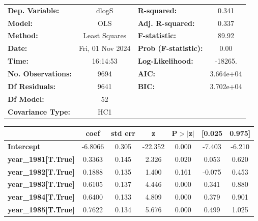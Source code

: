\begin{center}
\begin{tabular}{lclc}
\toprule
\textbf{Dep. Variable:}     &      dlogS       & \textbf{  R-squared:         } &     0.341   \\
\textbf{Model:}             &       OLS        & \textbf{  Adj. R-squared:    } &     0.337   \\
\textbf{Method:}            &  Least Squares   & \textbf{  F-statistic:       } &     89.92   \\
\textbf{Date:}              & Fri, 01 Nov 2024 & \textbf{  Prob (F-statistic):} &     0.00    \\
\textbf{Time:}              &     16:14:53     & \textbf{  Log-Likelihood:    } &   -18265.   \\
\textbf{No. Observations:}  &        9694      & \textbf{  AIC:               } & 3.664e+04   \\
\textbf{Df Residuals:}      &        9641      & \textbf{  BIC:               } & 3.702e+04   \\
\textbf{Df Model:}          &          52      & \textbf{                     } &             \\
\textbf{Covariance Type:}   &       HC1        & \textbf{                     } &             \\
\bottomrule
\end{tabular}
\begin{tabular}{lcccccc}
                            & \textbf{coef} & \textbf{std err} & \textbf{z} & \textbf{P$> |$z$|$} & \textbf{[0.025} & \textbf{0.975]}  \\
\midrule
\textbf{Intercept}          &      -6.8066  &        0.305     &   -22.352  &         0.000        &       -7.403    &       -6.210     \\
\textbf{year\_1981[T.True]} &       0.3363  &        0.145     &     2.326  &         0.020        &        0.053    &        0.620     \\
\textbf{year\_1982[T.True]} &       0.1888  &        0.135     &     1.400  &         0.161        &       -0.075    &        0.453     \\
\textbf{year\_1983[T.True]} &       0.6105  &        0.137     &     4.446  &         0.000        &        0.341    &        0.880     \\
\textbf{year\_1984[T.True]} &       0.6400  &        0.133     &     4.809  &         0.000        &        0.379    &        0.901     \\
\textbf{year\_1985[T.True]} &       0.7622  &        0.134     &     5.676  &         0.000        &        0.499    &        1.025     \\

\end{tabular}
\end{center}

